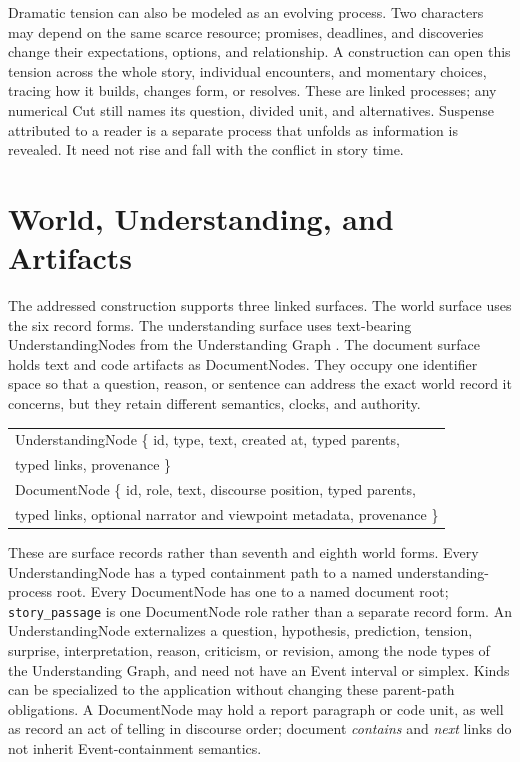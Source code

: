 \documentclass[11pt,a4paper]{article}
\begin{document}
Dramatic tension can also be modeled as an evolving process. Two characters
may depend on the same scarce resource; promises, deadlines, and discoveries
change their expectations, options, and relationship. A construction can open
this tension across the whole story, individual encounters, and momentary
choices, tracing how it builds, changes form, or resolves. These are linked
processes; any numerical Cut still names its question, divided unit, and
alternatives. Suspense attributed
to a reader is a separate process that unfolds as information is revealed.
It need not rise and fall with the conflict in story time.

\section{World, Understanding, and Artifacts}
\label{sec:interop}

The addressed construction supports three linked surfaces. The world surface
uses the six record forms. The understanding surface uses text-bearing
UnderstandingNodes from the Understanding Graph
\cite{westerbergUnderstanding2026}. The document surface holds text and code
artifacts as DocumentNodes.
They occupy one identifier space so that a question, reason, or sentence can
address the exact world record it concerns, but they retain different
semantics, clocks, and authority.

\begin{center}
\small\ttfamily
\begin{tabular}{@{}l@{}}
UnderstandingNode \{ id, type, text, created at, typed parents,\\
\qquad typed links, provenance \}\\
DocumentNode \{ id, role, text, discourse position, typed parents,\\
\qquad typed links, optional narrator and viewpoint metadata, provenance \}
\end{tabular}
\end{center}

These are surface records rather than seventh and eighth world forms. Every
UnderstandingNode has a typed containment path to a named
understanding-process root. Every DocumentNode has one to a named document
root; \texttt{story\_passage} is one DocumentNode role rather than a separate
record form. An UnderstandingNode externalizes a question, hypothesis,
prediction, tension, surprise, interpretation, reason, criticism, or revision,
among the node types of the Understanding Graph, and need not have an Event
interval or simplex. Kinds can be specialized to the application
without changing these parent-path obligations. A DocumentNode may hold a
report paragraph or code unit, as well as record an act of telling in discourse
order; document \emph{contains} and \emph{next} links do not inherit
Event-containment semantics.
\end{document}
